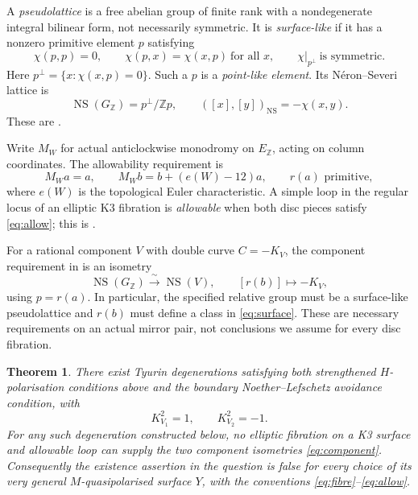 \documentclass[11pt]{article}
\newtheorem{theorem}{Theorem}[section]
\theoremstyle{definition}
\theoremstyle{remark}
\newcommand{\Z}{\mathbb Z}
\newcommand{\NS}{\operatorname{NS}}
\begin{document}
A \emph{pseudolattice} is a free abelian group of finite rank with a nondegenerate integral bilinear form, not necessarily symmetric. It is \emph{surface-like} if it has a nonzero primitive element $p$ satisfying
\[
\chi(p,p)=0,\qquad \chi(p,x)=\chi(x,p)\ \text{for all }x,
\qquad \chi|_{p^\perp}\ \text{is symmetric}.
\]
Here $p^\perp=\{x:\chi(x,p)=0\}$. Such a $p$ is a \emph{point-like element}. Its N\'eron--Severi lattice is
\begin{equation}\label{eq:surface}
\NS(G_{\Z})=p^\perp/\Z p,\qquad
([x],[y])_{\NS}=-\chi(x,y).
\end{equation}
These are \cite[Definitions~2.5--2.6]{GT}.

Write $M_W$ for actual anticlockwise monodromy on $E_{\Z}$, acting on column coordinates. The allowability requirement is
\begin{equation}\label{eq:allow}
M_Wa=a,\qquad M_Wb=b+(e(W)-12)a,\qquad r(a)\text{ primitive},
\end{equation}
where $e(W)$ is the topological Euler characteristic. A simple loop in the regular locus of an elliptic K3 fibration is \emph{allowable} when both disc pieces satisfy \eqref{eq:allow}; this is \cite[Assumption~4.9 and Definition~4.11]{GT}.

For a rational component $V$ with double curve $C=-K_V$, the component requirement in \cite[Definition~5.1(2)]{GT} is an isometry
\begin{equation}\label{eq:component}
\NS(G_{\Z})\xrightarrow{\ \sim\ }\NS(V),\qquad [r(b)]\longmapsto -K_V,
\end{equation}
using $p=r(a)$. In particular, the specified relative group must be a surface-like pseudolattice and $r(b)$ must define a class in \eqref{eq:surface}. These are necessary requirements on an actual mirror pair, not conclusions we assume for every disc fibration.

\begin{theorem}\label{thm:main}
There exist Tyurin degenerations satisfying both strengthened $H$-polarisation conditions above and the boundary Noether--Lefschetz avoidance condition, with
\[
K_{V_1}^2=1,\qquad K_{V_2}^2=-1.
\]
For any such degeneration constructed below, no elliptic fibration on a K3 surface and allowable loop can supply the two component isometries \eqref{eq:component}. Consequently the existence assertion in the question is false for every choice of its very general $M$-quasipolarised surface $Y$, with the conventions \eqref{eq:fibre}--\eqref{eq:allow}.
\end{theorem}
\end{document}

